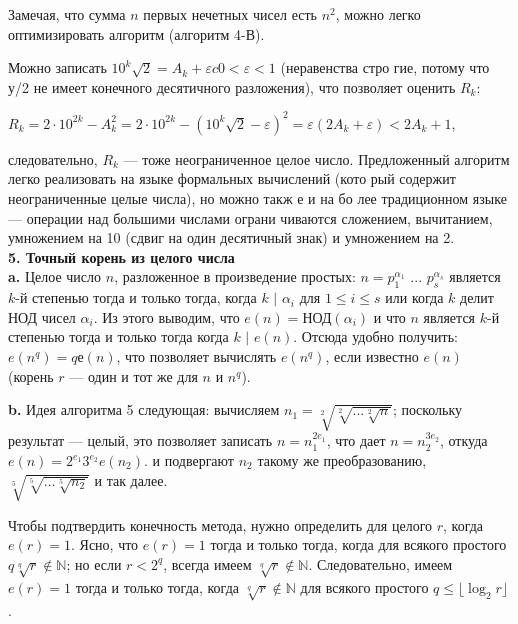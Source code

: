 \documentclass{mai_book}
\begin{document}
Замечая,  что сумма $n$
  первых  нечетных  чисел  есть  $n^{2}$, можно легко 
оптимизировать алгоритм  (алгоритм 4-В).

Можно  записать  $10^{k}\sqrt{2} =  A_{k} + \varepsilon c 0 < \varepsilon <  1 $  (неравенства  стро­
гие,  потому  что 
у/2
 не  имеет  конечного  десятичного  разложения),  что 
позволяет оценить $R_{k}$:
\begin{center}
$R_{k} = 2 \cdot 10^{2k} - A_{k}^{2} =  2 \cdot 10^{2k} - (10^{k}\sqrt{2} - \varepsilon)^{2} = \varepsilon(2A_{k} + \varepsilon) < 2A_{k} + 1$,
\end{center}
следовательно, $R_{k}$ —
 тоже неограниченное  целое число.  Предложенный 
алгоритм легко  реализовать  на языке  формальных  вычислений  (кото­
рый  содержит неограниченные  целые  числа),  но  можно такж е  и  на бо­
лее  традиционном  языке  —  операции  над  большими  числами  ограни­
чиваются  сложением,  вычитанием,  умножением  на  10  (сдвиг  на  один 
десятичный  знак)  и  умножением  на 2.\\

\noindent
\textbf{5. Точный корень из целого числа}\\

\textbf{a.} Целое число $n$, разложенное в произведение простых: $n=p_{1}^{\alpha_{1}}$ ... $p_{s}^{\alpha_{s}}$
является $k$-й степенью  тогда и только тогда, когда $k\text{ | }\alpha_{i}$ для $1 \leqslant i \leqslant s$
или когда $k$ делит НОД чисел $\alpha_{i}$. Из  этого  выводим,  что $e(n) =  \text{НОД}(\alpha_{i})$  и  что $n$ является 
$k$-й степенью  тогда и  только  тогда  
когда $k\text{ | }e(n)$.  Отсюда  удобно  получить:  $e(n^{q}) =  qе(n)$,  что  позволяет 
вычислять  $e(n^{q})$,  если  известно  $e(n)$  (корень  $r$  —  один  и  тот   же  для $n$ и $n^{q}$).

\textbf{b.} Идея алгоритма 5 следующая: вычисляем $n_{1} = \sqrt[2]{\sqrt[2]{...\sqrt[2]{n}}}$;
по­скольку результат — целый, это позволяет записать $n=n_{1}^{2e_{1}}$, что дает
$n=n_{2}^{3e_{2}}$, откуда $e(n) = 2^{e_{1}}3^{e_{2}}e(n_{2})$. 
и  подвергают $n_{2}$
такому  же преобразованию, $\sqrt[5]{\sqrt[5]{...\sqrt[5]{n_{2}}}}$ и так далее.
\newpage

Чтобы подтвердить конечность метода, нужно определить для целого $r$,
когда $e(r) = 1$. Ясно, что $e(r) = 1$ тогда и только тогда, когда для всякого
простого $q \sqrt[q]{r} \notin \mathbb{N}$; но если $r < 2^q$, всегда имеем $\sqrt[q]{r} \notin \mathbb{N}$.
Следовательно, имеем $e(r) = 1$ тогда и только тогда, когда $\sqrt[q]{r} \notin \mathbb{N}$ для всякого простого $q \leqslant \lfloor\log_2{r}\rfloor$.
\end{document}
